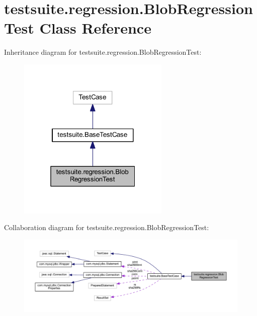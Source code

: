 \hypertarget{classtestsuite_1_1regression_1_1_blob_regression_test}{}\section{testsuite.\+regression.\+Blob\+Regression\+Test Class Reference}
\label{classtestsuite_1_1regression_1_1_blob_regression_test}


Inheritance diagram for testsuite.\+regression.\+Blob\+Regression\+Test\+:
\nopagebreak
\begin{figure}[H]
\begin{center}
\leavevmode
\includegraphics[width=205pt]{classtestsuite_1_1regression_1_1_blob_regression_test__inherit__graph}
\end{center}
\end{figure}


Collaboration diagram for testsuite.\+regression.\+Blob\+Regression\+Test\+:
\nopagebreak
\begin{figure}[H]
\begin{center}
\leavevmode
\includegraphics[width=350pt]{classtestsuite_1_1regression_1_1_blob_regression_test__coll__graph}
\end{center}
\end{figure}
